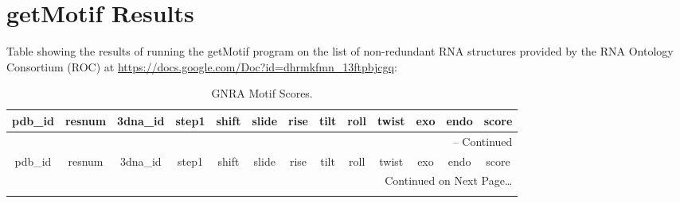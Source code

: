 \chapter{getMotif Results}
\label{appendix5a}

Table showing the results of  running the getMotif program on the list
of  non-redundant   RNA  structures  provided  by   the  RNA  Ontology
Consortium (ROC) at \url{https://docs.google.com/Doc?id=dhrmkfmn_13ftpbjcgq}: 

\footnotesize{
\begin{center}
\begin{longtable}{|c|c|c|c|c|c|c|c|c|c|c|c|c|}
\caption{GNRA Motif Scores.}
\label{tab:gnrascores}\\
\hline
pdb\_id & resnum & 3dna\_id & step1 &  shift & slide & rise & tilt & roll
& twist & exo & endo & score \\ \hline \hline
\endfirsthead

\multicolumn{13}{r}{{\tablename} \thetable{} -- Continued} \\
\hline
pdb\_id & resnum & 3dna\_id & step1 &  shift & slide & rise & tilt & roll
& twist & exo & endo & score \\ \hline \hline


\endhead

\multicolumn{13}{r}{Continued on Next Page\ldots} \\
\endfoot
\endlastfoot


\end{longtable}
\end{center}}
